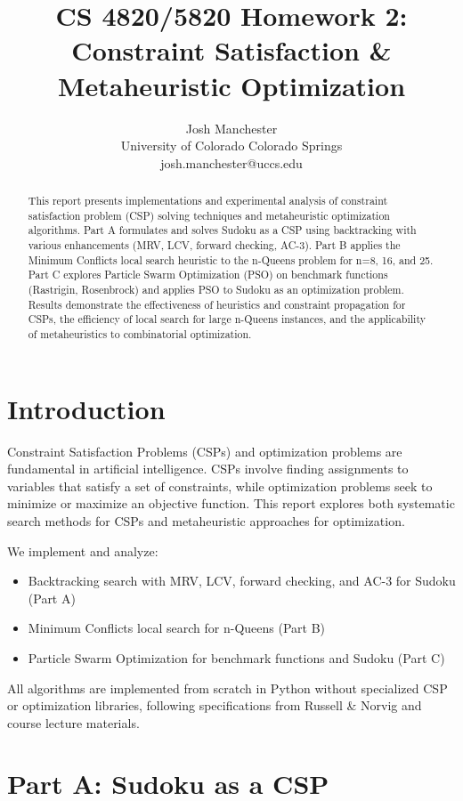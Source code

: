 \documentclass[letterpaper]{article}
\title{CS 4820/5820 Homework 2:\\
Constraint Satisfaction \& Metaheuristic Optimization}
\author{
Josh Manchester\\
University of Colorado Colorado Springs\\
josh.manchester@uccs.edu
}
\begin{document}
\maketitle

\begin{abstract}
This report presents implementations and experimental analysis of constraint satisfaction problem (CSP) solving techniques and metaheuristic optimization algorithms. Part A formulates and solves Sudoku as a CSP using backtracking with various enhancements (MRV, LCV, forward checking, AC-3). Part B applies the Minimum Conflicts local search heuristic to the n-Queens problem for n=8, 16, and 25. Part C explores Particle Swarm Optimization (PSO) on benchmark functions (Rastrigin, Rosenbrock) and applies PSO to Sudoku as an optimization problem. Results demonstrate the effectiveness of heuristics and constraint propagation for CSPs, the efficiency of local search for large n-Queens instances, and the applicability of metaheuristics to combinatorial optimization.
\end{abstract}

\section{Introduction}

Constraint Satisfaction Problems (CSPs) and optimization problems are fundamental in artificial intelligence. CSPs involve finding assignments to variables that satisfy a set of constraints, while optimization problems seek to minimize or maximize an objective function. This report explores both systematic search methods for CSPs and metaheuristic approaches for optimization.

We implement and analyze:
\begin{itemize}
\item Backtracking search with MRV, LCV, forward checking, and AC-3 for Sudoku (Part A)
\item Minimum Conflicts local search for n-Queens (Part B)
\item Particle Swarm Optimization for benchmark functions and Sudoku (Part C)
\end{itemize}

All algorithms are implemented from scratch in Python without specialized CSP or optimization libraries, following specifications from Russell \& Norvig \cite{russell2020} and course lecture materials.

\section{Part A: Sudoku as a CSP}
\end{document}
